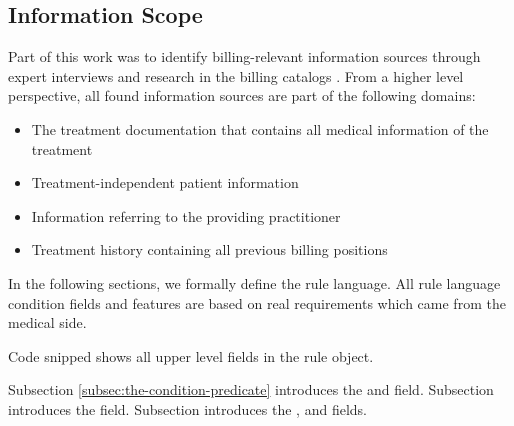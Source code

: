 \subsection{Information Scope}
Part of this work was
to identify billing-relevant information sources through expert interviews and research in the billing catalogs \addcite.
From a higher level perspective, all found information sources are part of the following domains:
\begin{itemize}
    \item The treatment documentation that contains all medical information of the treatment
    \item Treatment-independent patient information
    \item Information referring to the providing practitioner
    \item Treatment history containing all previous billing positions
\end{itemize}

In the following sections, we formally define the rule language.
All rule language condition fields and features are based on real requirements which came from the medical side.

Code snipped \addref shows all upper level fields in the rule object.



Subsection \ref{subsec:the-condition-predicate} introduces the  and   field.
Subsection \addref introduces the  field.
Subsection \addref introduces the ,  and  fields.



